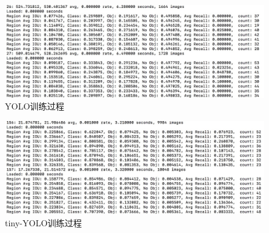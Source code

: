 {	\begin{figure}[htbp]
	\centering
	\includegraphics[width=5in]{images/trainYOLO.png}
	\caption{YOLO训练过程}
	\label{trainYOLO}
	\end{figure}
	\begin{figure}[htbp]
	\centering
	\includegraphics[width=5in]{images/trainTiny-YOLO.png}
	\caption{tiny-YOLO训练过程}
	\label{trainTiny-YOLO}
	\end{figure}
}

